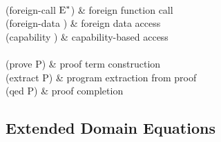\begin{grammar}
 \\
 (foreign-call \I{} \T{} ${\hbox{\rm E}}^*$) & foreign function call \\
 (foreign-data \I{} \T) & foreign data access \\
 (capability \I{} \E) & capability-based access \\[0.5em]

 \\
 (prove \T{} P) & proof term construction \\
 (extract P) & program extraction from proof \\
 (qed P) & proof completion
\end{grammar}

\subsection{Extended Domain Equations}


